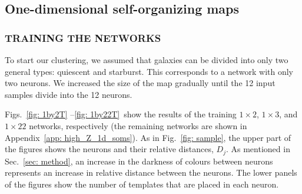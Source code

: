     \subsection{One-dimensional self-organizing maps}
    \label{sec: 1D}
        \subsubsection{TRAINING THE NETWORKS}
        \label{sec: 1Dt}
            To start our clustering, we assumed that galaxies can be divided into only two general types: quiescent and starburst.
            This corresponds to a network with only two neurons.
            We increased the size of the map gradually until the 12 input samples divide into the 12 neurons. 
        
            Figs.~\ref{fig: 1by2T} --\ref{fig: 1by22T}~show the results of the training $1\times2$, $1\times3$, and $1\times22$ networks, respectively (the remaining networks are shown in Appendix~\ref{app: high_Z_1d_soms}).
            As in Fig.~\ref{fig: sample}, the upper part of the figures shows the neurons and their relative distances, $D_j$.
            As mentioned in Sec.~\ref{sec: method}, an increase in the darkness of colours between neurons represents an increase in relative distance between the neurons.
            The lower panels of the figures show the number of  templates that are placed in each neuron. 
